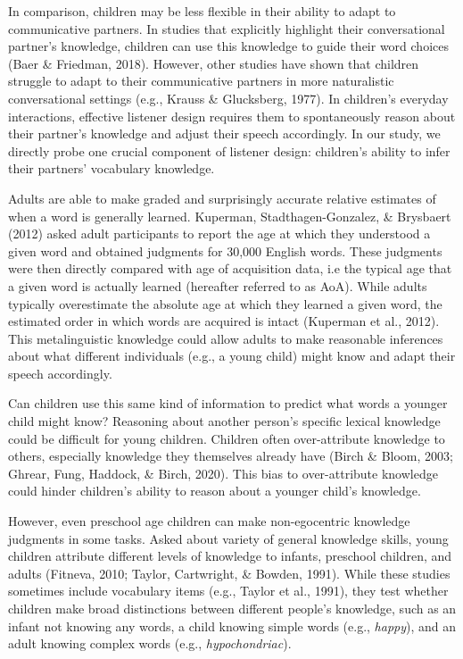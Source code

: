 \documentclass[10pt, letterpaper]{article}
\begin{document}
In comparison, children may be less flexible in their ability to adapt
to communicative partners. In studies that explicitly highlight their
conversational partner's knowledge, children can use this knowledge to
guide their word choices (Baer \& Friedman, 2018). However, other
studies have shown that children struggle to adapt to their
communicative partners in more naturalistic conversational settings
(e.g., Krauss \& Glucksberg, 1977). In children's everyday interactions,
effective listener design requires them to spontaneously reason about
their partner's knowledge and adjust their speech accordingly. In our
study, we directly probe one crucial component of listener design:
children's ability to infer their partners' vocabulary knowledge.

Adults are able to make graded and surprisingly accurate relative
estimates of when a word is generally learned. Kuperman,
Stadthagen-Gonzalez, \& Brysbaert (2012) asked adult participants to
report the age at which they understood a given word and obtained
judgments for 30,000 English words. These judgments were then directly
compared with age of acquisition data, i.e the typical age that a given
word is actually learned (hereafter referred to as AoA). While adults
typically overestimate the absolute age at which they learned a given
word, the estimated order in which words are acquired is intact
(Kuperman et al., 2012). This metalinguistic knowledge could allow
adults to make reasonable inferences about what different individuals
(e.g., a young child) might know and adapt their speech accordingly.

Can children use this same kind of information to predict what words a
younger child might know? Reasoning about another person's specific
lexical knowledge could be difficult for young children. Children often
over-attribute knowledge to others, especially knowledge they themselves
already have (Birch \& Bloom, 2003; Ghrear, Fung, Haddock, \& Birch,
2020). This bias to over-attribute knowledge could hinder children's
ability to reason about a younger child's knowledge.

However, even preschool age children can make non-egocentric knowledge
judgments in some tasks. Asked about variety of general knowledge
skills, young children attribute different levels of knowledge to
infants, preschool children, and adults (Fitneva, 2010; Taylor,
Cartwright, \& Bowden, 1991). While these studies sometimes include
vocabulary items (e.g., Taylor et al., 1991), they test whether children
make broad distinctions between different people's knowledge, such as an
infant not knowing any words, a child knowing simple words (e.g.,
\emph{happy}), and an adult knowing complex words (e.g.,
\emph{hypochondriac}).
\end{document}
